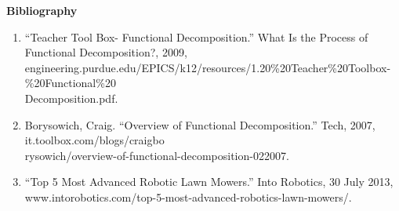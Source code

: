 \documentclass{article}
\begin{document}
    \noindent\begin{large}\textbf{Bibliography}\end{large}
    
    \begin{enumerate}
    	\item “Teacher Tool Box- Functional Decomposition.” What Is the Process of Functional Decomposition?, 2009, engineering.purdue.edu/EPICS/k12/resources/1.20\%20Teacher\%20Toolbox-\%20Functional\%20\\Decomposition.pdf.
    	\item Borysowich, Craig. “Overview of Functional Decomposition.” Tech, 2007, it.toolbox.com/blogs/craigbo\\rysowich/overview-of-functional-decomposition-022007.
    	\item “Top 5 Most Advanced Robotic Lawn Mowers.” Into Robotics, 30 July 2013, www.intorobotics.com/top-5-most-advanced-robotics-lawn-mowers/.
    \end{enumerate}
    
\end{document}
